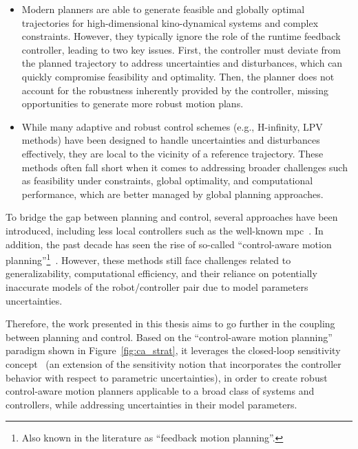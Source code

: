 \begin{itemize}
  \item Modern planners are able to generate feasible and globally optimal trajectories for high-dimensional kino-dynamical systems and complex constraints. 
  However, they typically ignore the role of the runtime feedback controller, leading to two key issues.
  First, the controller must deviate from the planned trajectory to address uncertainties and disturbances, which can quickly compromise feasibility and optimality.
  Then, the planner does not account for the robustness inherently provided by the controller, missing opportunities to generate more robust motion plans.
  \item While many adaptive and robust control schemes (e.g., H-infinity, LPV methods) have been designed to handle uncertainties and disturbances effectively, they are local to the vicinity of a reference trajectory. 
  These methods often fall short when it comes to addressing broader challenges such as feasibility under constraints, global optimality, and computational performance, which are better managed by global planning approaches.
\end{itemize}
    
To bridge the gap between planning and control, several approaches have been introduced, including less local controllers such as the well-known \gls{mpc}~\cite{cTMPC}. 
In addition, the past decade has seen the rise of so-called ``control-aware motion planning''\footnote{Also known in the literature as ``feedback motion planning''.}~\cite{cTognon, cContractThMP, cMajundarLibrary}. 
However, these methods still face challenges related to generalizability, computational efficiency, and their reliance on potentially inaccurate models of the robot/controller pair due to model parameters uncertainties.

Therefore, the work presented in this thesis aims to go further in the coupling between planning and control. 
Based on the ``control-aware motion planning'' paradigm shown in Figure~\ref{fig:ca_strat}, it leverages the closed-loop sensitivity concept~\cite{cPi,cTh} (an extension of the sensitivity notion that incorporates the controller behavior with respect to parametric uncertainties), in order to create robust control-aware motion planners applicable to a broad class of systems and controllers, while addressing uncertainties in their model parameters.

